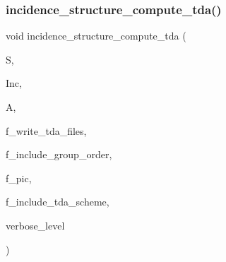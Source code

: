 \subsubsection{\texorpdfstring{incidence\+\_\+structure\+\_\+compute\+\_\+tda()}{incidence\_structure\_compute\_tda()}}
{\footnotesize\ttfamily void incidence\+\_\+structure\+\_\+compute\+\_\+tda (\begin{DoxyParamCaption}\item[{\mbox{\hyperlink{classpartitionstack}{partitionstack}} \&}]{S,  }\item[{\mbox{\hyperlink{classincidence__structure}{incidence\+\_\+structure}} $\ast$}]{Inc,  }\item[{\mbox{\hyperlink{classaction}{action}} $\ast$}]{A,  }\item[{\mbox{\hyperlink{galois_8h_a09fddde158a3a20bd2dcadb609de11dc}{I\+NT}}}]{f\+\_\+write\+\_\+tda\+\_\+files,  }\item[{\mbox{\hyperlink{galois_8h_a09fddde158a3a20bd2dcadb609de11dc}{I\+NT}}}]{f\+\_\+include\+\_\+group\+\_\+order,  }\item[{\mbox{\hyperlink{galois_8h_a09fddde158a3a20bd2dcadb609de11dc}{I\+NT}}}]{f\+\_\+pic,  }\item[{\mbox{\hyperlink{galois_8h_a09fddde158a3a20bd2dcadb609de11dc}{I\+NT}}}]{f\+\_\+include\+\_\+tda\+\_\+scheme,  }\item[{\mbox{\hyperlink{galois_8h_a09fddde158a3a20bd2dcadb609de11dc}{I\+NT}}}]{verbose\+\_\+level }\end{DoxyParamCaption})}

\mbox{\label{_t_o_p___l_e_v_e_l_2incidence__structure_8_c_a21ab759f6e646f3fe703c17f39361448}} 
